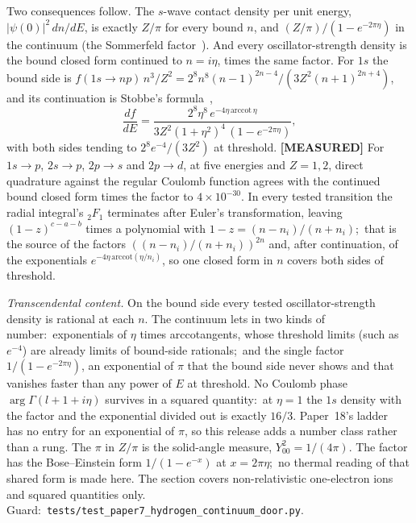 \documentclass[aps,pra,twocolumn,superscriptaddress,longbibliography]{revtex4-2}
\begin{document}
Two consequences follow. The $s$-wave contact density per unit energy, $|\psi(0)|^2\,dn/dE$, is exactly $Z/\pi$ for every bound $n$, and $(Z/\pi)/(1-e^{-2\pi\eta})$ in the continuum (the Sommerfeld factor~\cite{bethe_salpeter}). And every oscillator-strength density is the bound closed form continued to $n = i\eta$, times the same factor. For $1s$ the bound side is $f(1s\to np)\,n^3/Z^2 = 2^8 n^8 (n-1)^{2n-4}/(3Z^2(n+1)^{2n+4})$, and its continuation is Stobbe's formula~\cite{stobbe1930,bethe_salpeter},
\begin{equation}
\frac{df}{dE} = \frac{2^8\eta^8\, e^{-4\eta\,\mathrm{arccot}\,\eta}}{3Z^2(1+\eta^2)^4\,(1-e^{-2\pi\eta})},
\label{eq:stobbe}
\end{equation}
with both sides tending to $2^8e^{-4}/(3Z^2)$ at threshold. \textbf{[MEASURED]} For $1s\to p$, $2s\to p$, $2p\to s$ and $2p\to d$, at five energies and $Z = 1, 2$, direct quadrature against the regular Coulomb function agrees with the continued bound closed form times the factor to $4\times 10^{-30}$. In every tested transition the radial integral's ${}_2F_1$ terminates after Euler's transformation, leaving $(1-z)^{c-a-b}$ times a polynomial with $1-z = (n-n_i)/(n+n_i)$;\ that is the source of the factors $((n-n_i)/(n+n_i))^{2n}$ and, after continuation, of the exponentials $e^{-4\eta\,\mathrm{arccot}(\eta/n_i)}$, so one closed form in $n$ covers both sides of threshold.

\emph{Transcendental content.} On the bound side every tested oscillator-strength density is rational at each $n$. The continuum lets in two kinds of number:\ exponentials of $\eta$ times arccotangents, whose threshold limits (such as $e^{-4}$) are already limits of bound-side rationals;\ and the single factor $1/(1-e^{-2\pi\eta})$, an exponential of $\pi$ that the bound side never shows and that vanishes faster than any power of $E$ at threshold. No Coulomb phase $\arg\Gamma(l+1+i\eta)$ survives in a squared quantity:\ at $\eta = 1$ the $1s$ density with the factor and the exponential divided out is exactly $16/3$. Paper~18's ladder~\cite{loutey_paper18} has no entry for an exponential of $\pi$, so this release adds a number class rather than a rung. The $\pi$ in $Z/\pi$ is the solid-angle measure, $Y_{00}^2 = 1/(4\pi)$. The factor has the Bose--Einstein form $1/(1-e^{-x})$ at $x = 2\pi\eta$;\ no thermal reading of that shared form is made here. The section covers non-relativistic one-electron ions and squared quantities only. Guard:\ \texttt{tests/test\_paper7\_hydrogen\_continuum\_door.py}.
\end{document}
